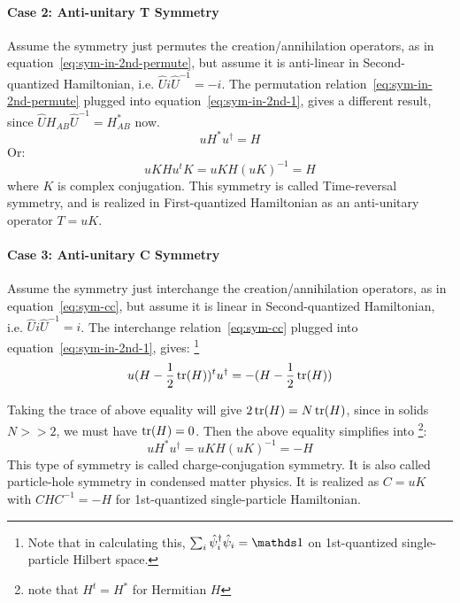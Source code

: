 \documentclass{article}
\begin{document}
\paragraph{Case 2: Anti-unitary T Symmetry}
Assume the symmetry just permutes the creation/annihilation operators, as in
equation~\ref{eq:sym-in-2nd-permute}, but assume it is anti-linear in
Second-quantized Hamiltonian, i.e. $\hat{U}i\hat{U}^{-1}=-i$. The permutation
relation~\ref{eq:sym-in-2nd-permute} plugged into
equation~\ref{eq:sym-in-2nd-1}, gives a different result, since
$\hat{U}H_{AB}\hat{U}^{-1} = H_{AB}^*$ now.
\begin{equation}
    u H^* u^\dagger = H
\end{equation}
Or:
\begin{equation}
    uK H u^t K = uK H (uK)^{-1} = H
\end{equation}
where $K$ is complex conjugation. This symmetry is called Time-reversal
symmetry, and is realized in First-quantized Hamiltonian as an anti-unitary
operator $T= uK$.

\paragraph{Case 3: Anti-unitary C Symmetry}
Assume the symmetry just interchange the creation/annihilation operators, as in
equation~\ref{eq:sym-cc}, but assume it is linear in Second-quantized
Hamiltonian, i.e. $\hat{U}i\hat{U}^{-1}=i$. The interchange
relation~\ref{eq:sym-cc} plugged into equation~\ref{eq:sym-in-2nd-1}, gives:
\footnote{
Note that in calculating this, $\sum_i\hat\psi^\dagger_i \hat\psi_i =
\id$ on 1st-quantized single-particle Hilbert space.
}
\begin{equation}
    \label{eq:sym-C-cond}
    u (H-\frac{1}{2}\tr(H))^t u^\dagger = - (H-\frac{1}{2}\tr(H))
\end{equation}

Taking the trace of above equality will give $2\tr(H)=N\tr(H)$, since
in solids $N>>2$, we must have $\tr(H)=0$. Then the above equality
simplifies into \footnote{note that $H^t = H^*$ for Hermitian $H$}:
\begin{equation}
    u H^* u^\dagger = uK H (uK)^{-1} = -H
\end{equation}
This type of symmetry is called charge-conjugation symmetry. It is
also called particle-hole symmetry in condensed matter physics. It is realized
as $C=uK$ with $C H C^{-1} = -H$ for 1st-quantized single-particle Hamiltonian.
\end{document}

